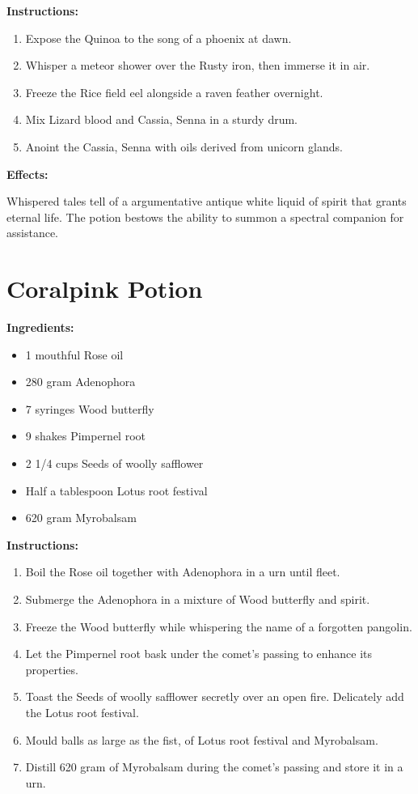 \documentclass{article}
\begin{document}
\textbf{Instructions:}

\begin{enumerate}
  \item Expose the Quinoa to the song of a phoenix at dawn.
  \item Whisper a meteor shower over the Rusty iron, then immerse it in air.
  \item Freeze the Rice field eel alongside a raven feather overnight.
  \item Mix Lizard blood and Cassia, Senna in a sturdy drum.
  \item Anoint the Cassia, Senna with oils derived from unicorn glands.
\end{enumerate}

\textbf{Effects:}

Whispered tales tell of a argumentative antique white liquid of spirit that grants eternal life. The potion bestows the ability to summon a spectral companion for assistance.

\newpage
\section*{Coralpink Potion}

\textbf{Ingredients:}

\begin{itemize}
  \item 1 mouthful Rose oil
  \item 280 gram Adenophora
  \item 7 syringes Wood butterfly
  \item 9 shakes Pimpernel root
  \item 2 1/4 cups Seeds of woolly safflower
  \item Half a tablespoon Lotus root festival
  \item 620 gram Myrobalsam
\end{itemize}

\textbf{Instructions:}

\begin{enumerate}
  \item Boil the Rose oil together with Adenophora in a urn until fleet.
  \item Submerge the Adenophora in a mixture of Wood butterfly and spirit.
  \item Freeze the Wood butterfly while whispering the name of a forgotten pangolin.
  \item Let the Pimpernel root bask under the comet’s passing to enhance its properties.
  \item Toast the Seeds of woolly safflower secretly over an open fire. Delicately add the Lotus root festival.
  \item Mould balls as large as the fist, of Lotus root festival and Myrobalsam.
  \item Distill 620 gram of Myrobalsam during the comet’s passing and store it in a urn.
\end{enumerate}
\end{document}
